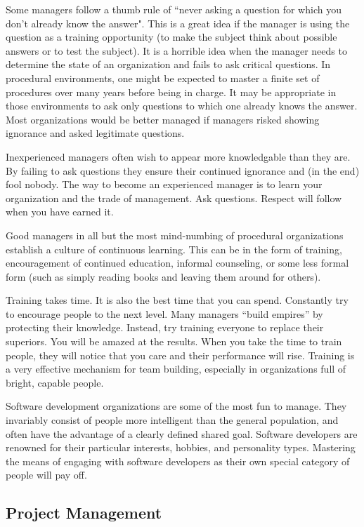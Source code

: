 Some managers follow a thumb rule of ``never asking a question for which you don't already know the answer".  This is a great idea if the manager is using the question as a training opportunity (to make the subject think about possible answers or to test the subject).  It is a horrible idea when the manager needs to determine the state of an organization and fails to ask critical questions.  In procedural environments, one might be expected to master a finite set of procedures over many years before being in charge.  It may be appropriate in those environments to ask only questions to which one already knows the answer.  Most organizations would be better managed if managers risked showing ignorance and asked legitimate questions.

Inexperienced managers often wish to appear more knowledgable than they are.  By failing to ask questions they ensure their continued ignorance and (in the end) fool nobody. The way to become an experienced manager is to learn your organization and the trade of management.  Ask questions. Respect will follow when you have earned it.

Good managers in all but the most mind-numbing of procedural organizations establish a culture of continuous learning. This can be in the form of training, encouragement of continued education, informal counseling, or some less formal form (such as simply reading books and leaving them around for others).

Training takes time.  It is also the best time that you can spend.  Constantly try to encourage people to the next level. Many managers ``build empires'' by protecting their knowledge. Instead, try training everyone to replace their superiors. You will be amazed at the results.  When you take the time to train people, they will notice that you care and their performance will rise.  Training is a very effective mechanism for team building, especially in organizations full of bright, capable people.

Software development organizations are some of the most fun to manage. They invariably consist of people more intelligent than the general population, and often have the advantage of a clearly defined shared goal. Software developers are renowned for their particular interests, hobbies, and personality types. Mastering the means of engaging with software developers as their own special category of people will pay off.


\subsection{Project Management}

